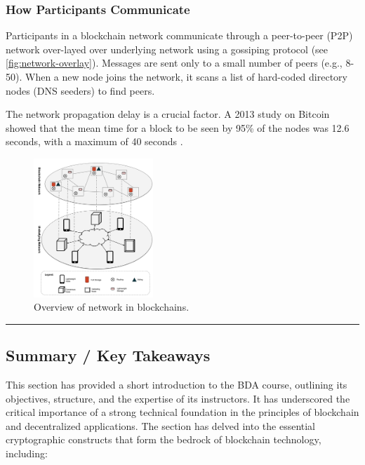 \subsubsection{How Participants
	Communicate}\label{how-participants-communicate}

Participants in a blockchain network communicate through a peer-to-peer
(P2P) network over-layed over underlying network using a gossiping protocol (see \autoref{fig:network-overlay}). Messages are sent only to a
small number of peers (e.g., 8-50). When a new node joins the network,
it scans a list of hard-coded directory nodes (DNS seeders) to find
peers.

The network propagation delay is a crucial factor. A 2013 study on
Bitcoin showed that the mean time for a block to be seen by 95\% of the
nodes was 12.6 seconds, with a maximum of 40 seconds .

\begin{figure}[t]
	\begin{center}
		\includegraphics[width=0.4\textwidth]{./figs/network-overlay.png} 
		\caption{Overview of network in blockchains.}		
		\label{fig:network-overlay}
	\end{center}	
\end{figure}

\begin{center}\rule{0.5\linewidth}{0.5pt}\end{center}

\subsection{Summary / Key Takeaways}\label{summary-key-takeaways}

This section has provided a short introduction to the BDA
course, outlining its objectives, structure, and the expertise of its
instructors. It has underscored the critical importance of a strong
technical foundation in the principles of blockchain and decentralized
applications. The section has delved into the essential cryptographic
constructs that form the bedrock of blockchain technology, including:

